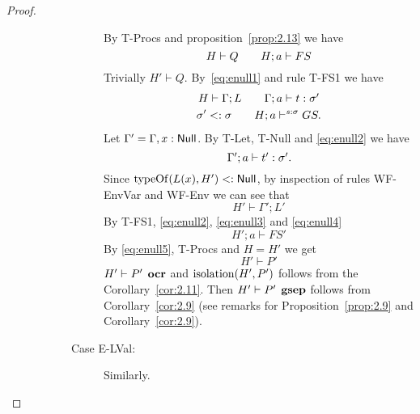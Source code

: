 \begin{proof}
\begin{description}
\begin{description}
\begin{description}
              By {\sc T-Procs} and proposition~\ref{prop:2.13} we have 
              \begin{equation} \label{eq:enull1}
               H \vdash Q  \quad\quad H; a \vdash FS 
              \end{equation}
              Trivially $H' \vdash Q$. 
              By~\eqref{eq:enull1} and rule {\sc T-FS1} we have
              \begin{equation} \label{eq:enull2}
                \begin{gathered}
                  H \vdash \Gamma; L \quad\quad \mbox{$\Gamma;a\vdash t:\sigma'$} \\
                  \sigma' <: \sigma \quad\quad H; a \vdash^{s: \sigma} GS.
                \end{gathered}
              \end{equation}
              Let $\Gamma' = \Gamma, x: \mbox{$\mathsf{Null}$}$. By {\sc T-Let}, {\sc
              T-Null} and \eqref{eq:enull2} we have
              \begin{equation} \label{eq:enull3}
                \mbox{$\Gamma';a\vdash t':\sigma'$}.
              \end{equation}
              Since $\mbox{$\mathrm{typeOf}$}(L(x), H') <: \mbox{$\mathsf{Null}$}$, by inspection of rules
              {\sc WF-EnvVar} and {\sc WF-Env} we can see that
              \begin{equation} \label{eq:enull4}
                H' \vdash \Gamma';L'
              \end{equation}
              By {\sc T-FS1}, \eqref{eq:enull2}, \eqref{eq:enull3} and \eqref{eq:enull4}
              \begin{equation}\label{eq:enull5}
                H';a \vdash FS'
              \end{equation}
              By \eqref{eq:enull5}, {\sc T-Procs} and $H = H'$ we get  
              \begin{equation}
                H' \vdash P'
              \end{equation}
              $H' \vdash P' \:\: \mbox{\bf ocr}$ and $\mbox{$\mathrm{isolation}$}{(H', P')}$ follows from
              the Corollary~\ref{cor:2.11}. Then $H' \vdash P'
              \:\: \mbox{\bf gsep}$ follows from Corollary~\ref{cor:2.9} (see remarks
              for Proposition~\ref{prop:2.9} and Corollary~\ref{cor:2.9}).

            \item[Case {\sc E-LVal}:] Similarly.


\end{description}
\end{description}
\end{description}
\end{proof}
